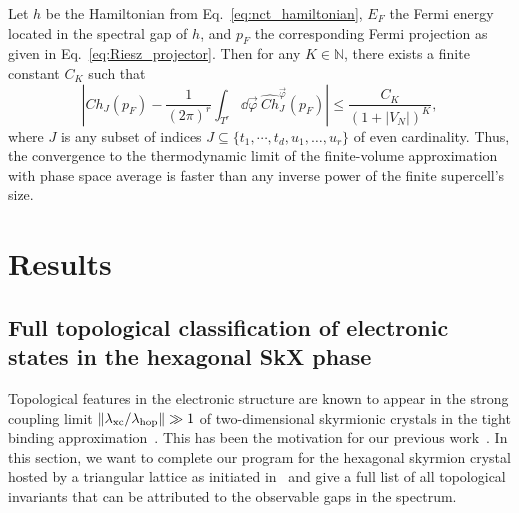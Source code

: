 \documentclass[submission, Phys]{SciPost}
\begin{document}
Let $h$ be the Hamiltonian from Eq.~\eqref{eq:nct_hamiltonian}, $E_F$ the Fermi energy located in the spectral gap of $h$, and $p_F$ the corresponding Fermi projection as given in Eq.~\eqref{eq:Riesz_projector}.
Then for any $K\in \mathbb{N}$, there exists a finite constant $C_K$ such that
\begin{equation}
    | Ch_J(p_F) - \frac{1}{(2\pi)^{r}} \int_{T^r}\dd \vec{\varphi} ~ \hat{Ch}^{\vec{\varphi}}_J(p_F) | \leq \frac{C_K}{(1+|V_N|)^K},
\end{equation}
where $J$ is any subset of indices $J\subseteq\{t_1, \cdots, t_d, u_1, \ldots, u_r\}$ of even cardinality.
Thus, the convergence to the thermodynamic limit of the finite-volume approximation with phase space average is faster than any inverse power of the finite supercell's size.

\section{Results}
\label{sec:results}

\subsection{Full topological classification of electronic states in the hexagonal SkX phase}

Topological features in the electronic structure are known to appear in the strong coupling limit $\| \lambda_\mathrm{xc} /\lambda_\mathrm{hop}\| \gg 1$ of two-dimensional skyrmionic crystals in the tight binding approximation~\cite{Hamamoto2015}.
This has been the motivation for our previous work~\cite{Lux2024}.
In this section, we want to complete our program for the hexagonal skyrmion crystal hosted by a triangular lattice as initiated in~\cite{Lux2024} and give a full list of all topological invariants that can be attributed to the observable gaps in the spectrum.
\end{document}
